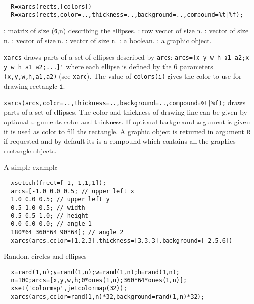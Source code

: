 
\begin{mandesc}
  \\ %
\end{mandesc}
\begin{calling_sequence}
\begin{verbatim}
  R=xarcs(rects,[colors])
  R=xarcs(rects,color=..,thickness=..,background=..,compound=%t|%f);
\end{verbatim}
\end{calling_sequence}

\begin{parameters}
  \begin{varlist}
    : matrix of size (6,n) describing the ellipses.
    : row vector of size n.
    : vector of size n.
    : vector of size n.
    : vector of size n.
    : a boolean.
    : a graphic object.
  \end{varlist}
\end{parameters}

\begin{mandescription}
  \verb!xarcs! draws parts of a set of ellipses described by \verb!arcs!:
  \verb!arcs=[x y w h a1 a2;x y w h a1 a2;...]'! where each ellipse is defined
  by the 6 parameters \verb!(x,y,w,h,a1,a2)! (see \verb!xarc!).
  The value of \verb!colors(i)! gives the color to use for drawing rectangle \verb!i!.

  \verb!xarcs(arcs,color=..,thickness=..,background=..,compound=%t|%f);!
  draws parts of a set of ellipses. The color and thickness of drawing line can be given by optional arguments
  color and thickness. If optional background argument is given it is used as color to fill
  the rectangle. A graphic object is returned in argument \verb!R! if requested and by default
  its is a compound which contains all the graphics rectangle objects.
\end{mandescription}

\begin{examples}

\noindent A simple example

\begin{Verbatim}
  xsetech(frect=[-1,-1,1,1]);
  arcs=[-1.0 0.0 0.5; // upper left x
  1.0 0.0 0.5; // upper left y
  0.5 1.0 0.5; // width
  0.5 0.5 1.0; // height
  0.0 0.0 0.0; // angle 1
  180*64 360*64 90*64]; // angle 2
  xarcs(arcs,color=[1,2,3],thickness=[3,3,3],background=[-2,5,6])
\end{Verbatim}

\noindent Random circles and ellipses

\begin{Verbatim}
  x=rand(1,n);y=rand(1,n);w=rand(1,n);h=rand(1,n);
  n=100;arcs=[x,y,w,h;0*ones(1,n);360*64*ones(1,n)];
  xset('colormap',jetcolormap(32));
  xarcs(arcs,color=rand(1,n)*32,background=rand(1,n)*32);
\end{Verbatim}

\end{examples}

